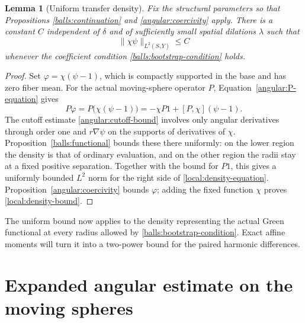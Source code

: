\documentclass[11pt]{article}
\newtheorem{lemma}[theorem]{Lemma}
\theoremstyle{definition}
\theoremstyle{remark}
\numberwithin{equation}{section}
\begin{document}
\begin{lemma}[Uniform transfer density]\label{local:density}
Fix the structural parameters so that Propositions
\ref{balls:continuation} and \ref{angular:coercivity} apply.  There is
a constant $C$ independent of $\delta$ and of sufficiently small
spatial dilations $\lambda$ such that
\begin{equation}\label{local:density-bound}
 \|\chi\psi\|_{L^2(S_\gamma Y)}\leq C
\end{equation}
whenever the coefficient condition
\eqref{balls:bootstrap-condition} holds.
\end{lemma}

\begin{proof}
Set $\varphi=\chi(\psi-1)$, which is compactly supported in the base
and has zero fiber mean.  For the actual moving-sphere operator $P$,
Equation~\eqref{angular:P-equation} gives
\begin{equation}\label{local:density-equation}
 P\varphi=P\bigl(\chi(\psi-1)\bigr)
       =-\chi P1+[P,\chi](\psi-1).
\end{equation}
The cutoff estimate \eqref{angular:cutoff-bound} involves only angular
derivatives through order one and $r\nabla\psi$ on the supports of
derivatives of $\chi$.  Proposition~\ref{balls:functional} bounds
these there uniformly: on the lower region the density is that of
ordinary evaluation, and on the other region the radii stay at a fixed
positive separation.  Together with the bound for $P1$, this gives a
uniformly bounded $L^2$ norm for the right side of
\eqref{local:density-equation}.
Proposition~\ref{angular:coercivity} bounds $\varphi$; adding the fixed
function $\chi$ proves \eqref{local:density-bound}.
\end{proof}

The uniform bound now applies to the density representing the actual
Green functional at every radius allowed by
\eqref{balls:bootstrap-condition}.  Exact affine moments will turn it
into a two-power bound for the paired harmonic differences.

\section{Expanded angular estimate on the moving spheres}
\label{angular-expanded:section}
\end{document}
